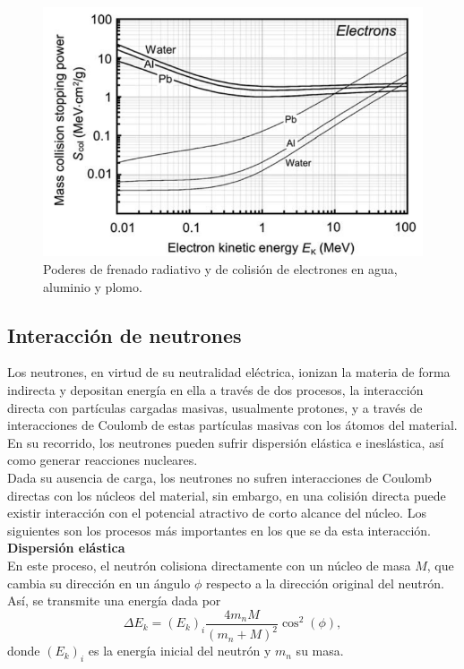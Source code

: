 \begin{figure}[H]
	\centering
	\includegraphics[width=0.7\linewidth]{images/stoppingPowerElectrons.png}
	\caption{Poderes de frenado radiativo y de colisión de electrones en agua, aluminio y plomo\cite{podgorsak}.}
	\label{fig:stoppingPower}
\end{figure}
\subsection{Interacción de neutrones}
Los neutrones, en virtud de su neutralidad eléctrica, ionizan la materia de forma indirecta y depositan energía en ella a través de dos procesos, la interacción directa con partículas cargadas masivas, usualmente protones, y a través de interacciones de Coulomb de estas partículas masivas con los átomos del material. En su recorrido, los neutrones pueden sufrir dispersión elástica e ineslástica, así como generar reacciones nucleares.\\

Dada su ausencia de carga, los neutrones no sufren interacciones de Coulomb directas con los núcleos del material, sin embargo, en una colisión directa puede existir interacción con el potencial atractivo de corto alcance del núcleo. Los siguientes son los procesos más importantes en los que se da esta interacción.\\

\textbf{Dispersión elástica}\\

En este proceso, el neutrón colisiona directamente con un núcleo de masa $M$, que cambia su dirección en un ángulo $\phi$ respecto a la dirección original del neutrón. Así, se transmite una energía dada por \cite{podgorsak}
\begin{equation}
	\Delta E_{k}=(E_{k})_i\frac{4m_{n}M}{(m_n+M)^2}\cos^2(\phi),
\end{equation}
donde $(E_k)_i$ es la energía inicial del neutrón y $m_n$ su masa.\\

